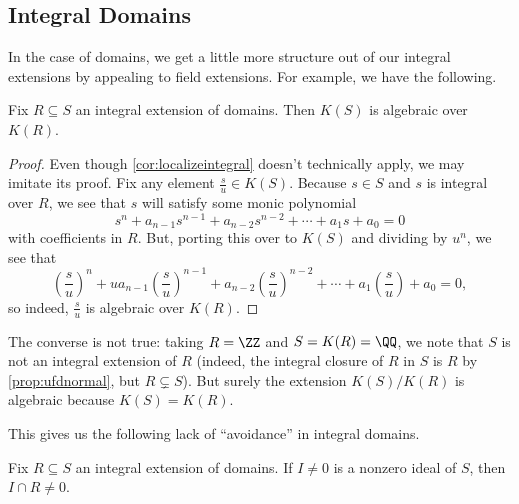 \subsection{Integral Domains}
In the case of domains, we get a little more structure out of our integral extensions by appealing to field extensions. For example, we have the following.
\begin{lemma} \label{lem:intgivesalg}
	Fix $R\subseteq S$ an integral extension of domains. Then $K(S)$ is algebraic over $K(R)$.
\end{lemma}
\begin{proof}
	Even though \autoref{cor:localizeintegral} doesn't technically apply, we may imitate its proof. Fix any element $\frac su\in K(S)$. Because $s\in S$ and $s$ is integral over $R$, we see that $s$ will satisfy some monic polynomial
	\[s^n+a_{n-1}s^{n-1}+a_{n-2}s^{n-2}+\cdots+a_1s+a_0=0\]
	with coefficients in $R$. But, porting this over to $K(S)$ and dividing by $u^n$, we see that
	\[\left(\frac su\right)^n+ua_{n-1}\left(\frac su\right)^{n-1}+a_{n-2}\left(\frac su\right)^{n-2}+\cdots+a_1\left(\frac su\right)+a_0=0,\]
	so indeed, $\frac su$ is algebraic over $K(R)$.
\end{proof}
\begin{remark}[Nir]
	The converse is not true: taking $R=\ZZ$ and $S=K(R)=\QQ$, we note that $S$ is not an integral extension of $R$ (indeed, the integral closure of $R$ in $S$ is $R$ by \autoref{prop:ufdnormal}, but $R\subsetneq S$). But surely the extension $K(S)/K(R)$ is algebraic because $K(S)=K(R)$.
\end{remark}
This gives us the following lack of ``avoidance'' in integral domains.
\begin{prop} \label{prop:nonzerointersect}
	Fix $R\subseteq S$ an integral extension of domains. If $I\ne0$ is a nonzero ideal of $S$, then $I\cap R\ne0$.
\end{prop}
